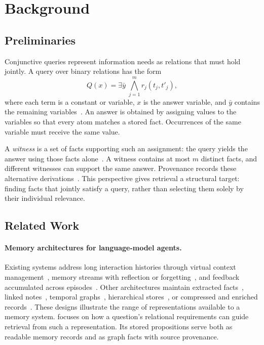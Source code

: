 \section{Background}
\label{sec:background}

\subsection{Preliminaries}
\label{sec:preliminaries}

Conjunctive queries represent information needs as relations that must
hold jointly. A query over binary relations has the form
\begin{equation}
 Q(x)=\exists\bar y\;\bigwedge_{j=1}^{m}r_j(t_j,t'_j),
 \label{eq:cq}
\end{equation}
where each term is a constant or variable, $x$ is the answer variable,
and $\bar y$ contains the remaining
variables~\cite{chandra1977conjunctive}. An answer is obtained by assigning
values to the variables so that every atom matches a stored fact.
Occurrences of the same variable must receive the same value.

A \emph{witness} is a set of facts supporting such an assignment: the
query yields the answer using those facts
alone~\cite{buneman2001why}. A witness contains at most $m$ distinct facts, and different witnesses can support the same answer.
Provenance records these alternative
derivations~\cite{green2007provenance}. This perspective gives retrieval
a structural target: finding facts that jointly satisfy a query, rather
than selecting them solely by their individual relevance.

\subsection{Related Work}
\label{sec:related}

\paragraph{Memory architectures for language-model agents.}
Existing systems address long interaction histories through virtual
context management~\cite{packer2023memgpt,lee2024readagent}, memory streams
with reflection or forgetting~\cite{park2023generative,zhong2024memorybank},
and feedback accumulated across
episodes~\cite{shinn2023reflexion,flexa2026bridging}. Other architectures
maintain extracted facts~\cite{chhikara2025mem0}, linked
notes~\cite{xu2025amem}, temporal
graphs~\cite{rasmussen2025zep,anokhin2025arigraph}, hierarchical
stores~\cite{kang2025memoryos,zhang2025gmemory}, or compressed and enriched
records~\cite{fang2026lightmem,liu2026simplemem,salama2025meminsight}.
These designs illustrate the range of representations available to a
memory system. \sys focuses on how a question's relational requirements
can guide retrieval from such a representation. Its stored propositions
serve both as readable memory records and as graph facts with source
provenance.


